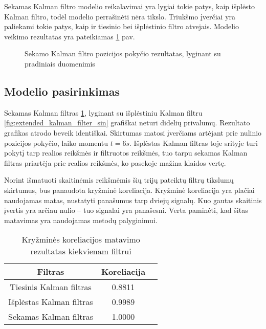 Sekamas Kalman filtro modelio reikalavimai yra lygiai tokie patys, kaip išplėsto Kalman filtro, todėl modelio perrašinėti nėra tikslo.
Triukšmo įverčiai yra paliekami tokie patys, kaip ir tiesinio bei išplėstinio filtro atvejais.
Modelio veikimo rezultatas yra pateikiamas \ref{fig:unscented_kalman_filter_sin} pav.

\begin{figure}
    \centering
    \caption{Sekamo Kalman filtro pozicijos pokyčio rezultatas, lyginant su pradiniais duomenimis}
    \label{fig:unscented_kalman_filter_sin}
\end{figure}

\subsection{Modelio pasirinkimas}

Sekamas Kalman filtras \ref{fig:unscented_kalman_filter_sin}, lyginant su išplėstiniu Kalman filtru \ref{fig:extended_kalman_filter_sin} grafiškai neturi didelių privalumų.
Rezultato grafikas atrodo beveik identiškai.
Skirtumas matosi įverčiams artėjant prie nulinio pozicijos pokyčio, laiko momentu $t=6s$.
Išplėstas Kalman filtras toje srityje turi pokytį tarp realios reikšmės ir filtruotos reikšmės, tuo tarpu sekamas Kalman filtras priartėja prie realios reikšmės, ko pasekoje mažina klaidos vertę.

Norint išmatuoti skaitinėmis reikšmėmis šių trijų pateiktų filtrų tikslumų skirtumus, bus panaudota kryžminė koreliacija.
Kryžminė koreliacija yra plačiai naudojamas matas, nustatyti panašumus tarp dviejų signalų.
Kuo gautas skaitinis įvertis yra arčiau nulio -- tuo signalai yra panašesni.
Verta paminėti, kad šitas matavimas yra naudojamas metodų palyginimui.

\begin{table}
    \centering
    \caption{Kryžminės koreliacijos matavimo rezultatas kiekvienam filtrui}
    \label{table:kalman_filter_comparison}
    \begin{tabular}{|c|c|c|} \hline
        Filtras & Koreliacija \\ \hline
        Tiesinis Kalman filtras & 0.8811 \\ \hline
        Išplėstas Kalman filtras & 0.9989 \\ \hline
        Sekamas Kalman filtras & 1.0000 \\ \hline
    \end{tabular}
\end{table}

